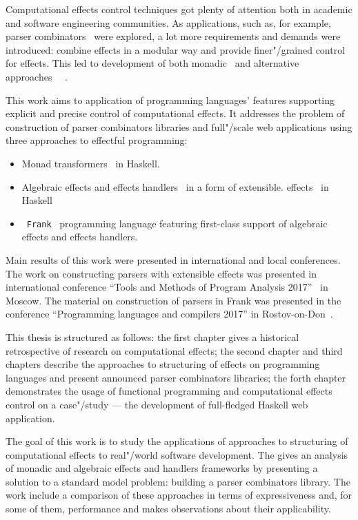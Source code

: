 Computational effects control techniques got plenty of attention both in academic and software engineering communities. As applications, such as, for example, parser combinators~\cite{monParsing} were explored, a lot more requirements and demands
were introduced: combine effects in a modular way and provide finer"/grained control
for effects. This led to development of both monadic~\cite{Liang:1995:MTM:199448.199528} and alternative approaches~\cite{Mcbride:2008:APE:1348940.1348941}
~\cite{DBLP:journals/jlp/BauerP15}.

This work aims to application of programming languages' features supporting explicit
and precise control of computational effects. It addresses the problem
of construction of parser combinators libraries and full"/scale web applications
using three approaches to effectful programming:

\begin{itemize}
  \item Monad transformers~\cite{Liang:1995:MTM:199448.199528} in Haskell.
  \item Algebraic effects and effects handlers~\cite{DBLP:journals/jlp/BauerP15}
  in a form of extensible.
  effects~\cite{Kiselyov:2013:EEA:2578854.2503791} in Haskell
  \item~\texttt{Frank}~\cite{DBLP:conf/popl/LindleyMM17} programming language featuring first-class support of algebraic
  effects and effects handlers.
\end{itemize}

Main results of this work were presented in international and local conferences.
The work on constructing parsers with extensible effects was presented in 
international conference ``Tools and Methods of Program Analysis 2017''~\cite{tmpaExtEffects}
in Moscow. The material on construction of parsers in Frank was presented in the
conference ``Programming languages and compilers 2017'' in Rostov-on-Don~\cite{plcFrank}.

This thesis is structured as follows: the first chapter gives a historical retrospective
of research on computational effects; the second chapter and third chapters describe the
approaches to structuring of effects on programming languages and present announced parser combinators libraries; the forth chapter demonstrates the usage of functional programming
and computational effects control on a case"/study --- the development of full-fledged
Haskell web application.

\Goal

The goal of this work is to study the applications of approaches to structuring
of computational effects to real"/world software development. The gives an analysis
of monadic and algebraic effects and handlers frameworks by presenting a solution
to a standard model problem: building a parser combinators library. The work
include a comparison of these approaches in terms of expressiveness and, for some of them,
performance and makes observations about their applicability.


